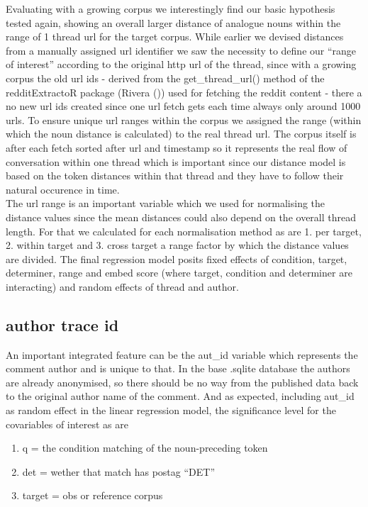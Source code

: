 \documentclass[
  12pt,
  oneside]{book}
\providecommand{\tightlist}{%
  \setlength{\itemsep}{0pt}\setlength{\parskip}{0pt}}
\begin{document}
Evaluating with a growing corpus we interestingly find our basic hypothesis tested again, showing an overall larger distance of analogue nouns within the range of 1 thread url for the target corpus. While earlier we devised distances from a manually assigned url identifier we saw the necessity to define our ``range of interest'' according to the original http url of the thread, since with a growing corpus the old url ids - derived from the get\_thread\_url() method of the redditExtractoR package (Rivera ()) used for fetching the reddit content - there a no new url ids created since one url fetch gets each time always only around 1000 urls. To ensure unique url ranges within the corpus we assigned the range (within which the noun distance is calculated) to the real thread url. The corpus itself is after each fetch sorted after url and timestamp so it represents the real flow of conversation within one thread which is important since our distance model is based on the token distances within that thread and they have to follow their natural occurence in time.\\
The url range is an important variable which we used for normalising the distance values since the mean distances could also depend on the overall thread length. For that we calculated for each normalisation method as are 1. per target, 2. within target and 3. cross target a range factor by which the distance values are divided. The final regression model posits fixed effects of condition, target, determiner, range and embed score (where target, condition and determiner are interacting) and random effects of thread and author.

\subsection{author trace id}\label{author-trace-id}

An important integrated feature can be the aut\_id variable which represents the comment author and is unique to that. In the base .sqlite database the authors are already anonymised, so there should be no way from the published data back to the original author name of the comment. And as expected, including aut\_id as random effect in the linear regression model, the significance level for the covariables of interest as are

\begin{enumerate}
\def\labelenumi{\arabic{enumi}.}
\tightlist
\item
  q = the condition matching of the noun-preceding token
\item
  det = wether that match has postag ``DET''
\item
  target = obs or reference corpus
\end{enumerate}
\end{document}
